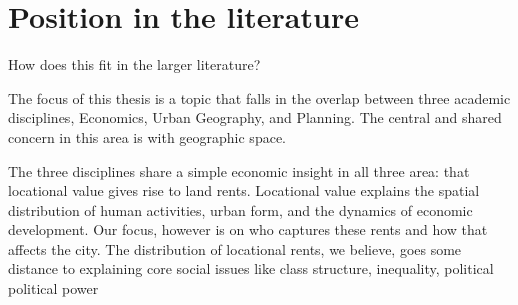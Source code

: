 \section{Position in the literature}
How does this fit in the larger literature?

The focus of this thesis is a topic that falls in the overlap between three academic  disciplines, Economics, Urban Geography, and Planning. %
The central and shared concern in this area is with geographic space. %



The three disciplines share a simple economic insight in all three area: that locational value gives rise to land rents.  %
Locational value explains the spatial distribution of human activities, urban form,  %
and the dynamics of economic development.  Our focus, however is on who captures these rents and how that affects the city. The distribution of locational rents, we believe, goes some distance to explaining core social issues like class structure, inequality, political political power %


